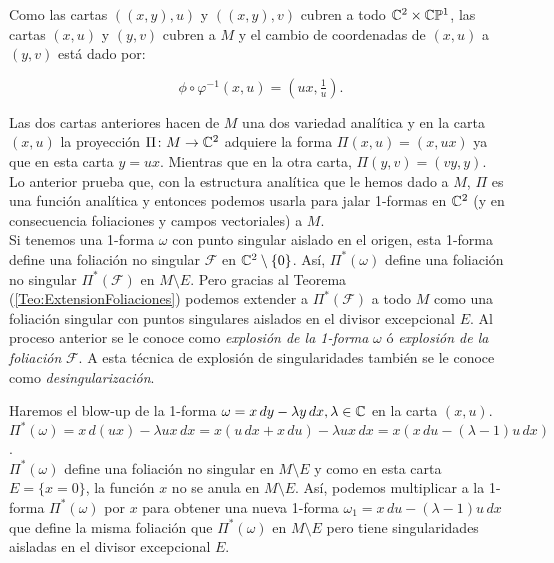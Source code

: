Como las cartas $((x,y),u)$ y $((x,y),v)$ cubren a todo $\mathbb{C}^{2}\times\mathbb{C}\mathbb{P}^{1}$, las cartas $(x,u)$ y $(y,v)$ cubren a $M$ y el cambio de coordenadas de $(x,u)$ a $(y,v)$ está dado por:

\begin{equation}
\label{CambiosCoordenadasExplosion}
\phi\circ\varphi^{-1}(x,u)=(ux,\tfrac{1}{u}).
\end{equation}

Las dos cartas anteriores hacen de $M$ una dos variedad analítica y en la carta $(x,u)$ la proyección $\Pi\colon M\rightarrow\mathbb{C}^{2}$ adquiere la forma $\Pi(x,u)=(x,ux)$ ya que en esta carta $y=ux$. Mientras que en la otra carta, $\Pi(y,v)=(vy,y)$.\\

Lo anterior prueba que, con la estructura analítica que le hemos dado a $M$, $\Pi$ es una función analítica y entonces podemos usarla para jalar 1-formas en $\mathbb{C}^{2}$ (y en consecuencia foliaciones y campos vectoriales) a $M$.\\

Si tenemos una 1-forma $\omega$ con punto singular aislado en el origen, esta 1-forma define una foliación no singular $\mathcal{F}$ en $\mathbb{C}^{2}\setminus\{0\}$. Así, $\Pi^{*}(\omega)$ define una foliación no singular $\Pi^{*}(\mathcal{F})$ en $M\setminus E$. Pero gracias al Teorema (\ref{Teo:ExtensionFoliaciones}) podemos extender a $\Pi^{*}(\mathcal{F})$ a todo $M$ como una foliación singular con puntos singulares aislados en el divisor excepcional $E$. Al proceso anterior se le conoce como \emph{explosión de la 1-forma} $\omega$ ó \emph{explosión de la foliación} $\mathcal{F}$. A esta técnica de explosión de singularidades también se le conoce como \emph{desingularización}.

\begin{Ejemplo}
\label{Ej:BlowUpLineal}
Haremos el blow-up de la 1-forma $\omega=x\, dy-\lambda y\, dx,\lambda\in\mathbb{C}$ en la carta $(x,u)$.\\

$\Pi^{*}(\omega)=x\, d(ux)-\lambda ux\, dx=x(u\, dx +x\, du)-\lambda ux\, dx=x(x\, du-(\lambda-1)u\, dx)$.\\

$\Pi^{*}(\omega)$ define una foliación no singular en $M\setminus E$ y como en esta carta $E=\{x=0\}$, la función $x$ no se anula en $M\setminus E$. Así, podemos multiplicar a la 1-forma $\Pi^{*}(\omega)$ por $x$ para obtener una nueva 1-forma $\omega_{1}=x\, du-(\lambda-1)u\, dx$ que define la misma foliación que $\Pi^{*}(\omega)$ en $M\setminus E$ pero tiene singularidades aisladas en el divisor excepcional $E$.
\end{Ejemplo}

